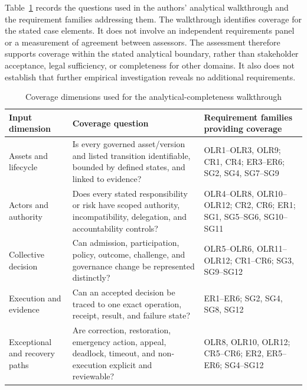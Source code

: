 \documentclass[journal]{IEEEtran}
\begin{document}
Table~\ref{tab:derivation_coverage} records the questions used
in the authors' analytical walkthrough and the requirement
families addressing them. The walkthrough identifies coverage
for the stated case elements. It does not involve an independent
requirements panel or a measurement of agreement between
assessors. The assessment therefore supports coverage within
the stated analytical boundary, rather than stakeholder
acceptance, legal sufficiency, or completeness for other domains.
It also does not establish that further empirical investigation
reveals no additional requirements.

\begin{table}[t]
\caption{Coverage dimensions used for the analytical-completeness
walkthrough}
\label{tab:derivation_coverage}
\centering
\renewcommand{\arraystretch}{1.10}
\setlength{\tabcolsep}{4pt}
\begin{tabular}{p{3.0cm}p{6.2cm}p{7.4cm}}
\hline
\textbf{Input dimension} &
\textbf{Coverage question} &
\textbf{Requirement families providing coverage}\\
\hline

Assets and lifecycle &
Is every governed asset/version and listed transition
identifiable, bounded by defined states, and linked to evidence? &
OLR1--OLR3, OLR9; CR1, CR4; ER3--ER6;
SG2, SG4, SG7--SG9\\

Actors and authority &
Does every stated responsibility or risk have scoped authority,
incompatibility, delegation, and accountability controls? &
OLR4--OLR8, OLR10--OLR12; CR2, CR6; ER1;
SG1, SG5--SG6, SG10--SG11\\

Collective decision &
Can admission, participation, policy, outcome, challenge,
and governance change be represented distinctly? &
OLR5--OLR6, OLR11--OLR12; CR1--CR6;
SG3, SG9--SG12\\

Execution and evidence &
Can an accepted decision be traced to one exact operation,
receipt, result, and failure state? &
ER1--ER6; SG2, SG4, SG8, SG12\\

Exceptional and recovery paths &
Are correction, restoration, emergency action, appeal,
deadlock, timeout, and non-execution explicit and reviewable? &
OLR8, OLR10, OLR12; CR5--CR6; ER2, ER5--ER6;
SG4--SG12\\

\hline
\end{tabular}
\end{table}
\end{document}
